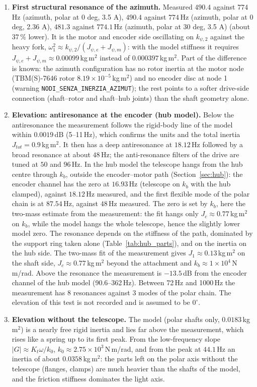 \documentclass[10pt,a4paper]{article}
\numberwithin{equation}{section}
\begin{document}
\begin{enumerate}
\item \textbf{First structural resonance of the azimuth.} Measured $490.4$ against $774$\,Hz (azimuth, polar at 0 deg, 3.5 A), $490.4$ against $774$\,Hz (azimuth, polar at 0 deg, 2.36 A), $481.3$ against $774.1$\,Hz (azimuth, polar at 30 deg, 3.5 A) (about $37\,\%$ lower). It is the motor and encoder side oscillating on $k_{\psi,2}$ against the heavy fork, $\omega_1^2\approx k_{\psi,2}/(J_{\psi,e} + J_{\psi,m})$: with the model stiffness it requires $J_{\psi,e} + J_{\psi,m} \approx 0.00099$\,kg\,m$^2$ instead of $0.000397$\,kg\,m$^2$. Part of the difference is known: the azimuth configuration has no rotor inertia at the motor node (TBM(S)-7646 rotor $8.19\times10^{-5}$\,kg\,m$^2$) and no encoder disc at node 1 (warning \texttt{NODI\_SENZA\_INERZIA\_AZIMUT}); the rest points to a softer drive-side connection (shaft--rotor and shaft--hub joints) than the shaft geometry alone.
\item \textbf{Elevation: antiresonance at the encoder (hub model).} Below the antiresonance the measurement follows the rigid-body line of the model within $0.0019$\,dB (5--11\,Hz), which confirms the units and the total inertia $J_{tot} = 0.9$\,kg\,m$^2$. It then has a deep antiresonance at $18.12$\,Hz followed by a broad resonance at about $48$\,Hz; the anti-resonance filters of the drive are tuned at $50$ and $96$\,Hz. In the hub model the telescope hangs from the hub centre through $k_b$, outside the encoder--motor path (Section~\ref{sec:hub}): the encoder channel has the zero at $16.93$\,Hz (telescope on $k_b$ with the hub clamped), against $18.12$\,Hz measured, and the first flexible mode of the polar chain is at $87.54$\,Hz, against $48$\,Hz measured. The zero is set by $k_b$, here the two-mass estimate from the measurement: the fit hangs only $J_c \approx 0.77$\,kg\,m$^2$ on $k_b$, while the model hangs the whole telescope, hence the slightly lower model zero. The resonance depends on the stiffness of the path, dominated by the support ring taken alone (Table~\ref{tab:hub_parts}), and on the inertia on the hub side. The two-mass fit of the measurement gives $J_1 \approx 0.13$\,kg\,m$^2$ on the shaft side, $J_c \approx 0.77$\,kg\,m$^2$ beyond the attachment and $k_b \approx 1\times10^{4}$\,N\,m/rad. Above the resonance the measurement is $-13.5$\,dB from the encoder channel of the hub model (90.6--362\,Hz). Between 72\,Hz and 1000\,Hz the measurement has 8 resonances against 3 modes of the polar chain. The elevation of this test is not recorded and is assumed to be $0^\circ$.
\item \textbf{Elevation without the telescope.} The model (polar shafts only, $0.0183$\,kg\,m$^2$) is a nearly free rigid inertia and lies far above the measurement, which rises like a spring up to its first peak. From the low-frequency slope $|G| \approx K_t\omega/k_0$, $k_0 \approx 2.75\times10^{3}$\,N\,m/rad, and from the peak at $44.1$\,Hz an inertia of about $0.0358$\,kg\,m$^2$: the parts left on the polar axis without the telescope (flanges, clamps) are much heavier than the shafts of the model, and the friction stiffness dominates the light axis.

\end{enumerate}
\end{document}
